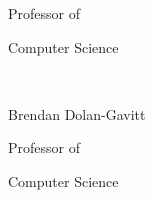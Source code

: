{\hspace{3.2 in} Professor of

\vspace{-.2 in}

\hspace{3.2 in} Computer Science 



\vspace{.2 in plus 1fill}

\hspace{3.2 in} \hrulefill\

\vspace{-.2 in}

\hspace{3.2 in} Brendan Dolan-Gavitt
\vspace{-.1 in}

\hspace{3.2 in} Professor of
\vspace{-.2 in}

\hspace{3.2 in} Computer Science

\vspace{0 in plus 1fill}

}
